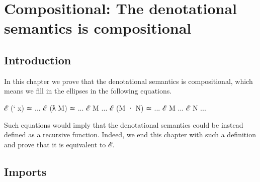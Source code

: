\hypertarget{Compositional}{%
\chapter{Compositional: The denotational semantics is
compositional}\label{Compositional}}

\begin{fence}
\begin{code}%
\>[0]\AgdaSpace{}%
\AgdaSpace{}%
\<%
\end{code}
\end{fence}

\hypertarget{introduction}{%
\section{Introduction}\label{introduction}}

In this chapter we prove that the denotational semantics is
compositional, which means we fill in the ellipses in the following
equations.

\begin{myDisplay}
ℰ (` x) ≃ ...
ℰ (ƛ M) ≃ ... ℰ M ...
ℰ (M · N) ≃ ... ℰ M ... ℰ N ...
\end{myDisplay}

Such equations would imply that the denotational semantics could be
instead defined as a recursive function. Indeed, we end this chapter
with such a definition and prove that it is equivalent to ℰ.

\hypertarget{imports}{%
\section{Imports}\label{imports}}

